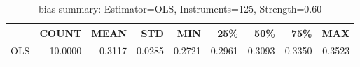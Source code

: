 \begin{table}[ht]
\centering
\caption{bias summary: Estimator=OLS, Instruments=125, Strength=0.60}
\begin{tabular}{lrrrrrrrr}
\toprule
 & COUNT & MEAN & STD & MIN & 25\% & 50\% & 75\% & MAX \\
\midrule
OLS & 10.0000 & 0.3117 & 0.0285 & 0.2721 & 0.2961 & 0.3093 & 0.3350 & 0.3523 \\
\bottomrule
\end{tabular}
\end{table}
